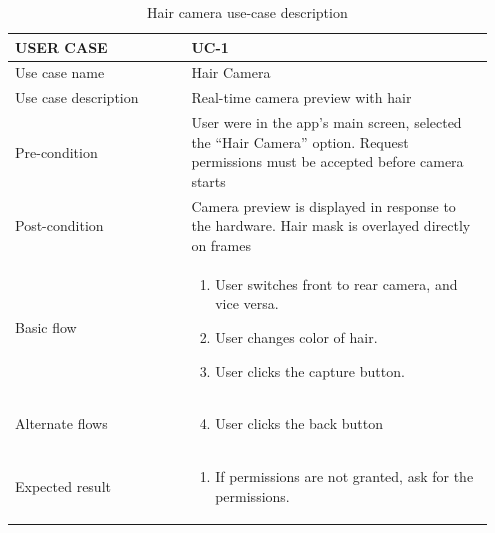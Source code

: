 \begin{center} 
\begin{table} [H]
\caption{Hair camera use-case description} 
\begin{tabular}{p{0.35\linewidth} | p{0.6\linewidth}}
\hline
USER CASE            & UC-1 \\ \hline
Use case name        & Hair Camera   \\ \hline
Use case description & Real-time camera preview with hair \\ \hline
Pre-condition         &   User were in the app's main screen, selected the “Hair Camera” option. Request permissions must be accepted before camera starts \\ \hline
Post-condition        &   Camera preview is displayed in response to the hardware. Hair mask is overlayed directly on frames  \\ \hline
Basic flow           &   \begin{enumerate}
    \item User switches front to rear camera, and vice versa.
    \item User changes color of hair.
    \item User clicks the capture button.
\end{enumerate}   \\ \hline
Alternate flows      &   \begin{enumerate}
    \setcounter{enumi}{3}
    \item User clicks the back button
\end{enumerate}   \\ \hline
Expected result      &  \begin{enumerate}
    \item If permissions are not granted, ask for the permissions.
\end{enumerate}    \\ \hline
\end{tabular}
\end{table}
\end{center}


